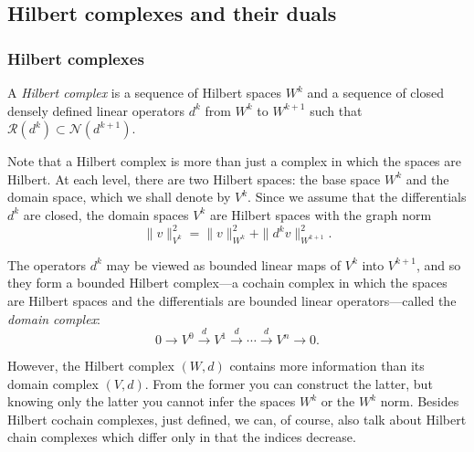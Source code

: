 \subsection{{Hilbert complexes and their duals}}\label{sec:hilbert-complexes-duals}

\subsubsection{{Hilbert complexes}}\label{subsec:hilbert-complexes-definition}

\begin{Definition}\label{def:hilbert-complex}
{A \emph{Hilbert complex} is a sequence of Hilbert spaces $W^k$ and a sequence of closed densely defined linear operators $d^k$ from $W^k$ to $W^{k+1}$ such that $\mathcal R(d^k)\subset\mathcal N(d^{k+1})$.}
\end{Definition}

{Note that a Hilbert complex is more than just a complex in which the spaces are Hilbert. At each level, there are two Hilbert spaces: the base space $W^k$ and the domain space, which we shall denote by $V^k$. Since we assume that the differentials $d^k$ are closed, the domain spaces $V^k$ are Hilbert spaces with the graph norm}
\[
\|v\|_{V^k}^2=\|v\|_{W^k}^2+\|d^k v\|_{W^{k+1}}^2.
\]

{The operators $d^k$ may be viewed as bounded linear maps of $V^k$ into $V^{k+1}$, and so they form a bounded Hilbert complex---a cochain complex in which the spaces are Hilbert spaces and the differentials are bounded linear operators---called the \emph{domain complex}:}
\begin{equation}\label{eq:hilbert-domain-complex}
0\to V^0\xrightarrow{d}V^1\xrightarrow{d}\cdots\xrightarrow{d}V^n\to0.
\end{equation}

{However, the Hilbert complex $(W,d)$ contains more information than its domain complex $(V,d)$. From the former you can construct the latter, but knowing only the latter you cannot infer the spaces $W^k$ or the $W^k$ norm. Besides Hilbert cochain complexes, just defined, we can, of course, also talk about Hilbert chain complexes which differ only in that the indices decrease.}

